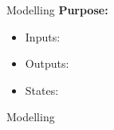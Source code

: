 
\begin{frame}{Modelling}{}
	\textbf{Purpose:} 
	\begin{itemize}
		\item Inputs: 
		\item Outputs: 
		\item States: 
	\end{itemize}


\end{frame}




\begin{frame}{Modelling}{}
	
\end{frame}






